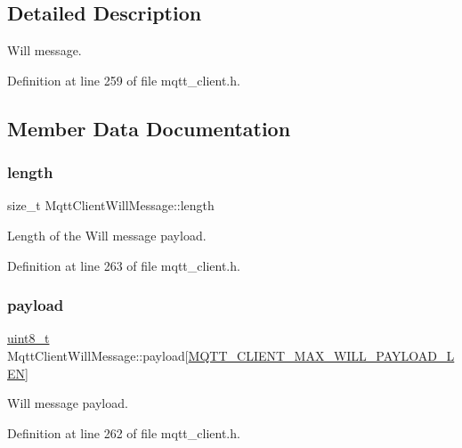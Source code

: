 \subsection{Detailed Description}
Will message. 

Definition at line 259 of file mqtt\+\_\+client.\+h.



\subsection{Member Data Documentation}
\mbox{\label{structMqttClientWillMessage_a9a77e5a108a85c2242f7d9f5333cde34}} 
\subsubsection{\texorpdfstring{length}{length}}
{\footnotesize\ttfamily size\+\_\+t Mqtt\+Client\+Will\+Message\+::length}



Length of the Will message payload. 



Definition at line 263 of file mqtt\+\_\+client.\+h.

\mbox{\label{structMqttClientWillMessage_a5c019bc3159b7c7cb82382cd66ae8180}} 
\subsubsection{\texorpdfstring{payload}{payload}}
{\footnotesize\ttfamily \hyperlink{stdint_8h_aba7bc1797add20fe3efdf37ced1182c5}{uint8\+\_\+t} Mqtt\+Client\+Will\+Message\+::payload\mbox{[}\hyperlink{mqtt__client_8h_a8f48f7302dbdeac54148f3b274706806}{M\+Q\+T\+T\+\_\+\+C\+L\+I\+E\+N\+T\+\_\+\+M\+A\+X\+\_\+\+W\+I\+L\+L\+\_\+\+P\+A\+Y\+L\+O\+A\+D\+\_\+\+L\+EN}\mbox{]}}



Will message payload. 



Definition at line 262 of file mqtt\+\_\+client.\+h.

